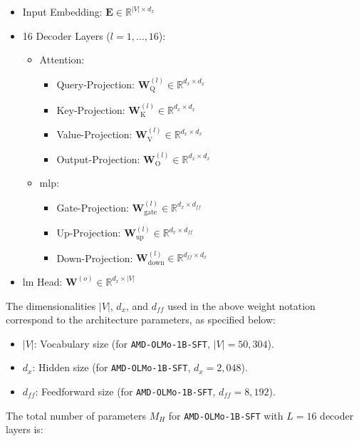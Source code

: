 \begin{itemize}
    \item Input Embedding: $\mathbf{E} \in \mathbb{R}^{|V| \times d_x}$
    \item 16 Decoder Layers ($l = 1, \ldots, 16$):
    \begin{itemize}
        \item Attention:
        \begin{itemize}
            \item Query-Projection:   $\mathbf{W}_\text{Q}^{(l)} \in \mathbb{R}^{d_x \times d_x}$
            \item Key-Projection:     $\mathbf{W}_\text{K}^{(l)} \in \mathbb{R}^{d_x \times d_x}$
            \item Value-Projection:   $\mathbf{W}_\text{V}^{(l)} \in \mathbb{R}^{d_x \times d_x}$
            \item Output-Projection:  $\mathbf{W}_\text{O}^{(l)} \in \mathbb{R}^{d_x \times d_x}$
        \end{itemize}
        \item \acrshort{mlp}:
        \begin{itemize}
            \item Gate-Projection:    $\mathbf{W}_\text{gate}^{(l)} \in \mathbb{R}^{d_x \times d_{ff}}$
            \item Up-Projection:      $\mathbf{W}_\text{up}^{(l)} \in \mathbb{R}^{d_x \times d_{ff}}$
            \item Down-Projection:    $\mathbf{W}_\text{down}^{(l)} \in \mathbb{R}^{d_{ff} \times d_x}$
        \end{itemize}
    \end{itemize}
    \item \acrshort{lm} Head: $\mathbf{W}^{(o)} \in \mathbb{R}^{d_x \times |V|}$
\end{itemize}
The dimensionalities $|V|$, $d_x$, and $d_{ff}$ used in the above weight notation correspond to the architecture parameters, as specified below:
\begin{itemize}
    \item $|V|$: Vocabulary size (for \texttt{AMD-OLMo-1B-SFT}, $|V| = 50{,}304$).
    \item $d_x$: Hidden size (for \texttt{AMD-OLMo-1B-SFT}, $d_x = 2{,}048$).
    \item $d_{ff}$: Feedforward size (for \texttt{AMD-OLMo-1B-SFT}, $d_{ff} = 8{,}192$).
\end{itemize}
The total number of parameters $M_H$ for \texttt{AMD-OLMo-1B-SFT} with $L = 16$ decoder layers is:
